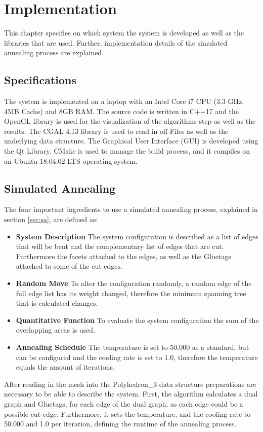 \documentclass[draft,final]{vutinfth} %
\begin{document}
\chapter{Implementation}
\label{chap:Implementation}
This chapter specifies on which system the system is developed as well as the libraries that are used. Further, implementation details of the simulated annealing process are explained.

\section{Specifications}
The system is implemented on a laptop with an Intel Core i7 CPU (3.3 GHz, 4MB Cache) and 8GB RAM. The source code is written in C++17 and the OpenGL library is used for the visualization of the algorithms step as well as the results. The CGAL 4.13 library is used to read in off-Files as well as the underlying data structure. The Graphical User Interface (GUI) is developed using the Qt Library. CMake is used to manage the build process, and it compiles on an Ubuntu 18.04.02 LTS operating system.

\section{Simulated Annealing}
\label{sec:annealing}
The four important ingredients to use a simulated annealing process, explained in section \ref{sec:sa}, are defined as:
\begin{itemize}
	\item \textbf{System Description} The system configuration is described as a list of edges that will be bent and the complementary list of edges that are cut. Furthermore the facets attached to the edges, as well as the Gluetags attached to some of the cut edges.
	\item \textbf{Random Move} To alter the configuration randomly, a random edge of the full edge list has its weight changed, therefore the minimum spanning tree that is calculated changes.
	\item \textbf{Quantitative Function} To evaluate the system configuration the sum of the overlapping areas is used.
	\item \textbf{Annealing Schedule} The temperature is set to 50.000 as a standard, but can be configured and the cooling rate is set to 1.0, therefore the temperature equals the amount of iterations.
\end{itemize}

After reading in the mesh into the Polyhedron\_3 data structure preparations are necessary to be able to describe the system. First, the algorithm calculates a dual graph and Gluetags, for each edge of the dual graph, as each edge could be a possible cut edge. Furthermore, it sets the temperature, and the cooling rate to 50.000 and 1.0 per iteration, defining the runtime of the annealing process.
\end{document}
